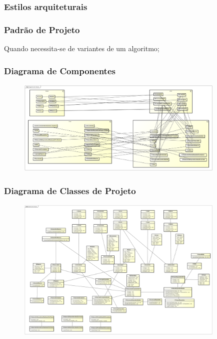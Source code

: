 \documentclass{beamer}
\begin{document}
  \begin{frame}

  \frametitle{Estilos arquiteturais}

  

  \end{frame}
  \begin{frame}

  \frametitle{Padrão de Projeto}

  Quando necessita-se de variantes de um algoritmo;

  \end{frame}
\begin{frame}
\frametitle{Diagrama de Componentes}

\begin{figure}[!ht]
\centering
\includegraphics[width=10cm]{Diagrama_de_Componentes.png}
\end{figure}

\end{frame}
\begin{frame}

\frametitle{Diagrama de Classes de Projeto}
\begin{figure}[!ht]
\centering
\includegraphics[width=10cm]{Diagrama_de_Classes.png}
\end{figure}

\end{frame}
\end{document}
